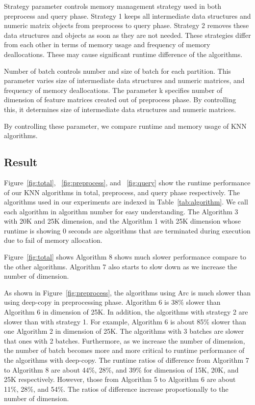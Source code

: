 Strategy parameter controls memory management strategy used in both preprocess and query phase.
Strategy 1 keeps all intermediate data structures and numeric matrix objects from preprocess to query phase. 
Strategy 2 removes these data structures and objects as soon as they are not needed. 
These strategies differ from each other in terms of memory usage and frequency of memory deallocations.
These may cause significant runtime difference of the algorithms.

Number of batch controls number and size of batch for each partition. This parameter varies size of intermediate data structures and numeric matrices, and 
frequency of memory deallocations. 
The parameter k specifies number of dimension of feature matrices created out of preprocess phase. 
By controlling this, it determines size of intermediate data structures and numeric matrices. 

By controlling these parameter, we compare runtime and memory usage of KNN algorithms. 


\subsection{Result}
\label{sec:history}
Figure~\ref{fig:total}, ~\ref{fig:preprocess}, and ~\ref{fig:query} show the runtime performance of our KNN algorithms in total, preprocess, and query phase respectively. 
The algorithms used in our experiments are indexed in Table~\ref{tab:algorithm}. We call each algorithm in algorithm number for easy understanding.
The Algorithm 3 with 20K and 25K dimension, and the Algorithm 1 with 25K dimension whose runtime is showing 0 seconds are algorithms that are terminated during execution due to fail of memory allocation.

Figure~\ref{fig:total} shows Algorithm 8 shows much slower performance compare to the other algorithms.
Algorithm 7 also starts to slow down as we increase the number of dimension.  

As shown in Figure~\ref{fig:preprocess}, the algorithms using Arc is much slower than using deep-copy in preprocessing phase. 
Algorithm 6 is 38\%  slower than Algorithm 6 in dimension of 25K. 
In addition, the algorithms with strategy 2 are slower than with strategy 1. 
For example, Algorithm 6 is about 85\% slower than one Algorithm 2 in dimension of 25K.
The algorithms with 3 batches are slower that ones with 2 batches. Furthermore, as we increase the number of dimension, the number of batch becomes more and more critical to runtime performance of the algorithms with deep-copy.
The runtime ratios of difference from Algorithm 7 to Algorithm 8 are about 44\%, 28\%, and 39\% for dimension of 15K, 20K, and 25K respectively. 
However, those from Algorithm 5 to Algorithm 6 are about 11\%, 28\%, and 54\%. The ratios of difference increase proportionally to the number of dimension. 

